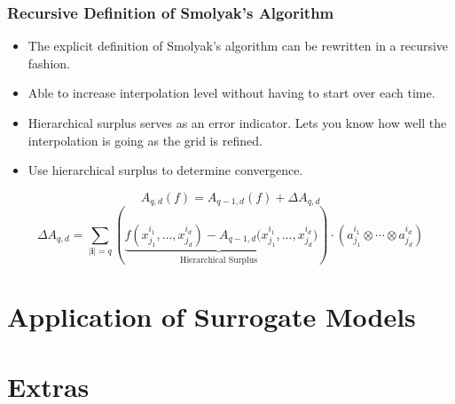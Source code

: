\documentclass{beamer}
\begin{document}
\begin{frame}
\frametitle{Recursive Definition of Smolyak's Algorithm}

\begin{itemize}
  \item The explicit definition of Smolyak's algorithm can be rewritten in a recursive fashion.
  \item Able to increase interpolation level without having to start over each time.
  \item Hierarchical surplus serves as an error indicator. Lets you know how well the interpolation is going as the grid is refined.
  \item Use hierarchical surplus to determine convergence.
\end{itemize}

\begin{equation}
 A_{q,d}(f) = A_{q-1,d}(f) + \Delta A_{q,d} \nonumber
\end{equation}
\begin{equation} 
 \Delta A_{q,d} = \sum_{\vert\textbf{i}\vert=q}
  \left( \underbrace{f(x_{j_1}^{i_1},...,x_{j_d}^{i_d}) - 
   A_{q-1,d}(x_{j_1}^{i_1},...,x_{j_d}^{i_d}}_{\text{Hierarchical Surplus}})\right)\cdot
    \left(a_{j_1}^{i_1}\otimes\cdots\otimes a_{j_d}^{i_d}\right) \nonumber
\end{equation}

\end{frame}




\section{Application of Surrogate Models}

\section{Extras}
\end{document}
